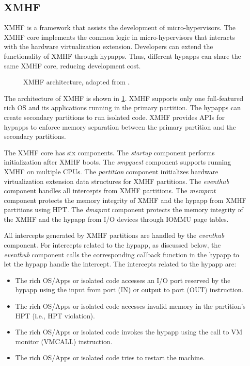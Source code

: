 \subsection{XMHF}
\label{sec:bg_xmhf}

XMHF \cite{vasudevan2013design} is a framework that assists the development of micro-hypervisors. The XMHF core implements the common logic in micro-hypervisors that interacts with the hardware virtualization extension. Developers can extend the functionality of XMHF through hypapps. Thus, different hypapps can share the same XMHF core, reducing development cost.

\begin{figure}[tbp]
	\begin{center}
	
	\end{center}
	\caption[XMHF architecture.]{XMHF architecture, adapted from \cite{vasudevan2013design}.}
	\label{fig:xmhf_arch}
\end{figure}

The architecture of XMHF is shown in \ref{fig:xmhf_arch}. XMHF supports only one full-featured rich OS and its applications running in the primary partition. The hypapps can create secondary partitions to run isolated code. XMHF provides APIs for hypapps to enforce memory separation between the primary partition and the secondary partitions.

The XMHF core has six components. The \textit{startup} component performs initialization after XMHF boots. The \textit{smpguest} component supports running XMHF on multiple CPUs. The \textit{partition} component initializes hardware virtualization extension data structures for XMHF partitions. The \textit{eventhub} component handles all intercepts from XMHF partitions. The \textit{memprot} component protects the memory integrity of XMHF and the hypapp from XMHF partitions using HPT. The \textit{dmaprot} component protects the memory integrity of the XMHF and the hypapp from I/O devices through IOMMU page tables.

All intercepts generated by XMHF partitions are handled by the \textit{eventhub} component. For intercepts related to the hypapp, as discussed below, the \textit{eventhub} component calls the corresponding callback function in the hypapp to let the hypapp handle the intercept. The intercepts related to the hypapp are:
\begin{itemize}
\item The rich OS/Apps or isolated code accesses an I/O port reserved by the hypapp using the input from port (IN) or output to port (OUT) instruction.
\item The rich OS/Apps or isolated code accesses invalid memory in the partition's HPT (i.e., HPT violation).
\item The rich OS/Apps or isolated code invokes the hypapp using the call to VM monitor (VMCALL) instruction.
\item The rich OS/Apps or isolated code tries to restart the machine.
\end{itemize}

